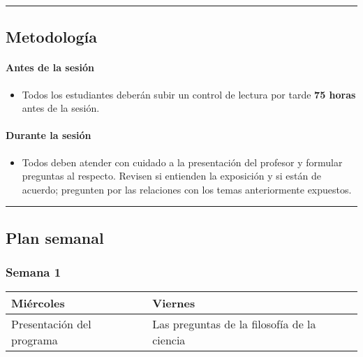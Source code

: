 \documentclass[spanish,]{article}
\providecommand{\tightlist}{%
  \setlength{\itemsep}{0pt}\setlength{\parskip}{0pt}}
\let\oldparagraph\paragraph
\renewcommand{\paragraph}[1]{\oldparagraph{#1}\mbox{}}
\begin{document}
\begin{center}\rule{0.5\linewidth}{\linethickness}\end{center}

\subsection{Metodología}\label{metodologia}

\paragraph{\texorpdfstring{\textbf{Antes de la
sesión}}{Antes de la sesión}}\label{antes-de-la-sesion}

\begin{itemize}
\tightlist
\item
  Todos los estudiantes deberán subir un control de lectura por tarde
  \textbf{75 horas} antes de la sesión.
\end{itemize}

\paragraph{\texorpdfstring{\textbf{Durante la
sesión}}{Durante la sesión}}\label{durante-la-sesion}

\begin{itemize}
\tightlist
\item
  Todos deben atender con cuidado a la presentación del profesor y
  formular preguntas al respecto. Revisen si entienden la exposición y
  si están de acuerdo; pregunten por las relaciones con los temas
  anteriormente expuestos.
\end{itemize}

\begin{center}\rule{0.5\linewidth}{\linethickness}\end{center}

\subsection{Plan semanal}\label{plan-semanal}

\subsubsection{Semana 1}\label{semana-1}

\begin{tabular}{| >{\raggedright\arraybackslash}p{10em}|>{\raggedright\arraybackslash}p{10em}|} 
\hline
\textbf{\textbf{Miércoles}} & \textbf{\textbf{Viernes}}\\
\hline
Presentación del programa & Las preguntas de la filosofía de la ciencia\\
\hline
\end{tabular}
\end{document}
